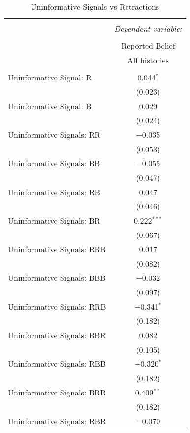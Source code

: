 
\begin{table}[!htbp] \centering \footnotesize
  \caption{Uninformative Signals vs Retractions} 
  \label{tab:uninformative_vs_retractions} 
\begin{tabular}{@{\extracolsep{5pt}}lc} 
\\[-1.8ex]\hline 
\hline \\[-1.8ex] 
 & \multicolumn{1}{c}{\textit{Dependent variable:}} \\ 
\cline{2-2} 
\\[-1.8ex] & Reported Belief \\ 
 & All histories \\ 
\hline \\[-1.8ex] 
 Uninformative Signal: R & 0.044$^{*}$ \\ 
  & (0.023) \\ 
  Uninformative Signal: B & 0.029 \\ 
  & (0.024) \\ 
  Uninformative Signals: RR & $-$0.035 \\ 
  & (0.053) \\ 
  Uninformative Signals: BB & $-$0.055 \\ 
  & (0.047) \\ 
  Uninformative Signals: RB & 0.047 \\ 
  & (0.046) \\ 
  Uninformative Signals: BR & 0.222$^{***}$ \\ 
  & (0.067) \\ 
  Uninformative Signals: RRR & 0.017 \\ 
  & (0.082) \\ 
  Uninformative Signals: BBB & $-$0.032 \\ 
  & (0.097) \\ 
  Uninformative Signals: RRB & $-$0.341$^{*}$ \\ 
  & (0.182) \\ 
  Uninformative Signals: BBR & 0.082 \\ 
  & (0.105) \\ 
  Uninformative Signals: RBB & $-$0.320$^{*}$ \\ 
  & (0.182) \\ 
  Uninformative Signals: BRR & 0.409$^{**}$ \\ 
  & (0.182) \\ 
  Uninformative Signals: RBR & $-$0.070 \\ 

\end{tabular}
\end{table}
